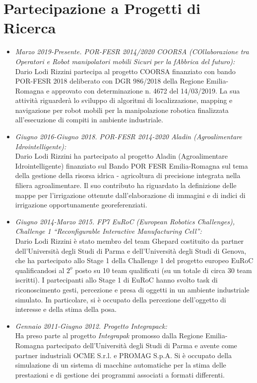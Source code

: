 \documentclass[11pt]{article}
\newcommand{\ITEMDATE}[1]{\item \textit{#1:}\\}
\begin{document}
\section*{Partecipazione a Progetti di Ricerca}

\begin{itemize}

\ITEMDATE{Marzo 2019-Presente. POR-FESR 2014/2020 COORSA (COllaborazione tra Operatori e Robot manipolatori mobili Sicuri per la fAbbrica del futuro)}
Dario Lodi Rizzini partecipa al progetto COORSA finanziato con bando POR-FESR 2018 deliberato con DGR
986/2018 della Regione Emilia-Romagna e approvato con determinazione n. 4672 del 14/03/2019.
La sua attivit\`a riguarder\`a lo sviluppo di algoritmi di localizzazione, mapping e navigazione per robot mobili 
per la manipolazione robotica finalizzata all'esecuzione di compiti in ambiente industriale. 

\ITEMDATE{Giugno 2016-Giugno 2018. POR-FESR 2014-2020 Aladin (Agroalimentare Idrointelligente)}
Dario Lodi Rizzini ha partecipato al progetto Aladin (Agroalimentare Idrointelligente) 
finanziato sul Bando POR FESR Emilia-Romagna sul tema della gestione della risorsa idrica - 
agricoltura di precisione integrata nella filiera agroalimentare. 
Il suo contributo ha riguardato la definizione delle mappe per l'irrigazione ottenute dall'elaborazione 
di immagini e di indici di irrigazione opportunamente georeferenziati.

\ITEMDATE{Giugno 2014-Marzo 2015. FP7 EuRoC (European Robotics Challenges), \\
           Challenge 1 ``Reconfigurable Interactive Manufacturing Cell''} 
Dario Lodi Rizzini \`e stato membro del team Ghepard costituito da partner dell'Universit\`a degli 
Studi di Parma e dell'Universit\`a degli Studi di Genova, che ha partecipato allo Stage 1 della 
Challenge 1 del progetto europeo EuRoC qualificandosi al $2^o$ posto su 10 team qualificati 
(su un totale di circa 30 team iscritti).
I partecipanti allo Stage 1 di EuRoC hanno svolto task di riconoscimento gesti, percezione e presa 
di oggetti in un ambiente industriale simulato. 
In particolare, si \`e occupato della percezione dell'oggetto di interesse e della stima della posa.

\ITEMDATE{Gennaio 2011-Giugno 2012. Progetto Integrapack} 
Ha preso parte al progetto \emph{Integrapak} promosso dalla Regione Emilia-Romagna partecipato 
dell'Universit\`a degli Studi di Parma
e avente come partner industriali OCME S.r.l. e PROMAG S.p.A.
Si \`e occupato della simulazione di un sistema di macchine automatiche per la stima delle prestazioni
e di gestione dei programmi associati a formati differenti. 


\end{itemize}
\end{document}
